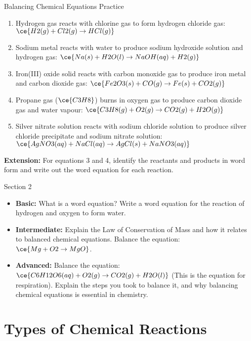 {\begin{investigation}{Balancing Chemical Equations Practice}
\begin{enumerate}
    \item  Hydrogen gas reacts with chlorine gas to form hydrogen chloride gas:  $\ce{H2(g) + Cl2(g) \rightarrow HCl(g)}$
    \item  Sodium metal reacts with water to produce sodium hydroxide solution and hydrogen gas: $\ce{Na(s) + H2O(l) \rightarrow NaOH(aq) + H2(g)}$
    \item  Iron(III) oxide solid reacts with carbon monoxide gas to produce iron metal and carbon dioxide gas: $\ce{Fe2O3(s) + CO(g) \rightarrow Fe(s) + CO2(g)}$
    \item  Propane gas ($\ce{C3H8}$) burns in oxygen gas to produce carbon dioxide gas and water vapour: $\ce{C3H8(g) + O2(g) \rightarrow CO2(g) + H2O(g)}$
    \item  Silver nitrate solution reacts with sodium chloride solution to produce silver chloride precipitate and sodium nitrate solution: $\ce{AgNO3(aq) + NaCl(aq) \rightarrow AgCl(s) + NaNO3(aq)}$
\end{enumerate}

\textbf{Extension:}  For equations 3 and 4, identify the reactants and products in word form and write out the word equation for each reaction.
\end{investigation}

\begin{tieredquestions}{Section 2}
\begin{itemize}
    \item \textbf{Basic:} What is a word equation? Write a word equation for the reaction of hydrogen and oxygen to form water.
    \item \textbf{Intermediate:} Explain the Law of Conservation of Mass and how it relates to balanced chemical equations. Balance the equation: $\ce{Mg + O2 \rightarrow MgO}$.
    \item \textbf{Advanced:} Balance the equation: $\ce{C6H12O6(aq) + O2(g) \rightarrow CO2(g) + H2O(l)}$ (This is the equation for respiration). Explain the steps you took to balance it, and why balancing chemical equations is essential in chemistry. 
\end{itemize}
\end{tieredquestions}

\section{Types of Chemical Reactions}

}

